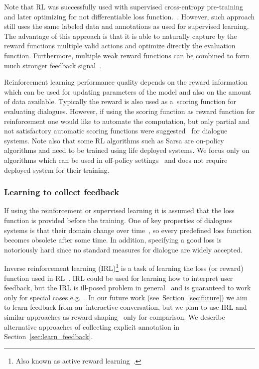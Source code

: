 \documentclass[11pt]{article}
\begin{document}
Note that RL was successfully used with supervised cross-entropy pre-training and later optimizing for not differentiable loss function.~\cite{williams2016end}.
However, such approach still uses the same labeled data and annotations as used for supervised learning.
The advantage of this approach is that it is able to naturally capture by the reward functions multiple valid actions and optimize directly the evaluation function.
Furthermore, multiple weak reward functions can be combined to form much stronger feedback signal~\cite{abbeel_apprenticeship_2004}.

Reinforcement learning performance quality depends on the reward information which can be used for updating parameters of the model and also on the amount of data available.
Typically the reward is also used as a~scoring function for evaluating dialogues.
However, if using the scoring function as reward function for reinforcement one would like to automate the computation, but only partial and not satisfactory automatic scoring functions were suggested~\cite{liu_how_2016,lowe_evaluation_2016} for dialogue systems. 
Note also that some RL algorithms such as Sarsa are on-policy algorithms and need to be trained using life deployed systems.
We focus only on algorithms which can be used in off-policy settings~\cite{sutton_reinforcement_1998} and does not require deployed system for their training.

\subsubsection*{Learning to collect feedback}\label{sub:irl}
If using the reinforcement or supervised learning it is assumed that the loss function is provided before the training.
One of key properties of dialogues systems is that their domain change over time~\cite{yu_evolvable_2016}, so every predefined loss function becomes obsolete after some time.
In addition, specifying a good loss is notoriously hard since no standard measures for dialogue are widely accepted.

Inverse reinforcement learning (IRL)\footnote{Also known as active reward learning~\cite{su2016active}.} is a task of learning the loss (or reward) function used in RL~\cite{abbeel_apprenticeship_2004}.
IRL could be used for learning how to interpret user feedback, but the IRL is ill-posed problem in general~\cite{choi_inverse_2011} and is guaranteed to work only for special cases e.g.~\cite{abbeel_apprenticeship_2004,choi_inverse_2011}.
In our future work (see~Section~\ref{sec:future}) we aim to learn feedback from an~interactive conversation, but we plan to use IRL and similar approaches as reward shaping~\cite{su2016active} only for comparison.
We describe alternative approaches of collecting explicit annotation in Section~\ref{sec:learn_feedback}.
\end{document}
